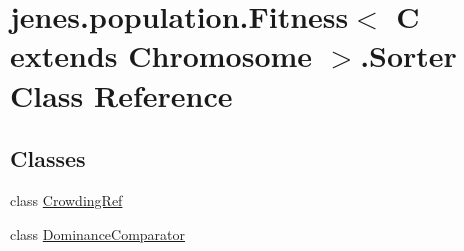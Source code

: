 \hypertarget{classjenes_1_1population_1_1_fitness_3_01_c_01extends_01_chromosome_01_4_1_1_sorter}{\section{jenes.\-population.\-Fitness$<$ C extends Chromosome $>$.Sorter Class Reference}
\label{classjenes_1_1population_1_1_fitness_3_01_c_01extends_01_chromosome_01_4_1_1_sorter}
}
\subsection*{Classes}
\begin{DoxyCompactItemize}
\item 
class \hyperlink{classjenes_1_1population_1_1_fitness_3_01_c_01extends_01_chromosome_01_4_1_1_sorter_1_1_crowding_ref}{Crowding\-Ref}
\item 
class \hyperlink{classjenes_1_1population_1_1_fitness_3_01_c_01extends_01_chromosome_01_4_1_1_sorter_1_1_dominance_comparator}{Dominance\-Comparator}
\end{DoxyCompactItemize}

